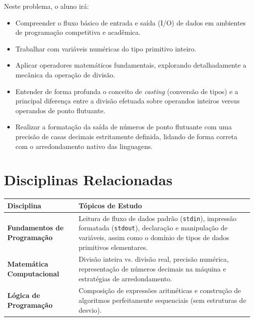 \documentclass[11pt]{article}
\begin{document}

\begin{objetivobox}
Neste problema, o aluno irá:
\begin{itemize}
    \item Compreender o fluxo básico de entrada e saída (I/O) de dados em ambientes de programação competitiva e acadêmica.
    \item Trabalhar com variáveis numéricas do tipo primitivo inteiro.
    \item Aplicar operadores matemáticos fundamentais, explorando detalhadamente a mecânica da operação de divisão.
    \item Entender de forma profunda o conceito de \textit{casting} (conversão de tipos) e a principal diferença entre a divisão efetuada sobre operandos inteiros versus operandos de ponto flutuante.
    \item Realizar a formatação da saída de números de ponto flutuante com uma precisão de casas decimais estritamente definida, lidando de forma correta com o arredondamento nativo das linguagens.
\end{itemize}
\end{objetivobox}

\section*{Disciplinas Relacionadas}
\begin{table}[h]
\centering
\begin{tabularx}{\textwidth}{>{\bfseries}l X}
\toprule
Disciplina & Tópicos de Estudo \\
\midrule
Fundamentos de Programação & Leitura de fluxo de dados padrão (\texttt{stdin}), impressão formatada (\texttt{stdout}), declaração e manipulação de variáveis, assim como o domínio de tipos de dados primitivos elementares. \\
\midrule
Matemática Computacional & Divisão inteira vs. divisão real, precisão numérica, representação de números decimais na máquina e estratégias de arredondamento. \\
\midrule
Lógica de Programação & Composição de expressões aritméticas e construção de algoritmos perfeitamente sequenciais (sem estruturas de desvio). \\
\bottomrule
\end{tabularx}
\end{table}
\end{document}
